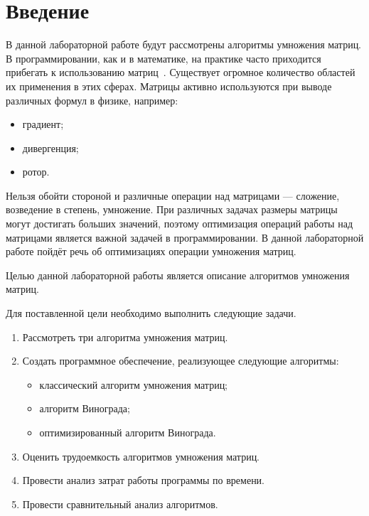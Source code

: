\chapter*{Введение}

В данной лабораторной работе будут рассмотрены алгоритмы умножения матриц.
В программировании, как и в математике, на практике часто приходится прибегать к использованию матриц~\cite{book_matrix}.
Существует огромное количество областей их применения в этих сферах.
Матрицы активно используются при выводе различных формул в физике, например:
\begin{itemize}
	\item градиент;
	\item дивергенция;
	\item ротор.
\end{itemize}

Нельзя обойти стороной и различные операции над матрицами --- сложение, возведение в степень, умножение.
При различных задачах размеры матрицы могут достигать больших значений, поэтому оптимизация операций работы над матрицами является важной задачей в программировании.
В данной лабораторной работе пойдёт речь об оптимизациях операции умножения матриц.

Целью данной лабораторной работы является описание алгоритмов умножения матриц.

Для поставленной цели необходимо выполнить следующие задачи.
\begin{enumerate}[label={\arabic*)}]
	\item Рассмотреть три алгоритма умножения матриц.
	\item Создать программное обеспечение, реализующее следующие алгоритмы:
	\begin{itemize}[label=---]
		\item классический алгоритм умножения матриц;
		\item алгоритм Винограда;
		\item оптимизированный алгоритм Винограда.
	\end{itemize}
	\item Оценить трудоемкость алгоритмов умножения матриц.
	\item Провести анализ затрат работы программы по времени.
	\item Провести сравнительный анализ алгоритмов.
\end{enumerate}
